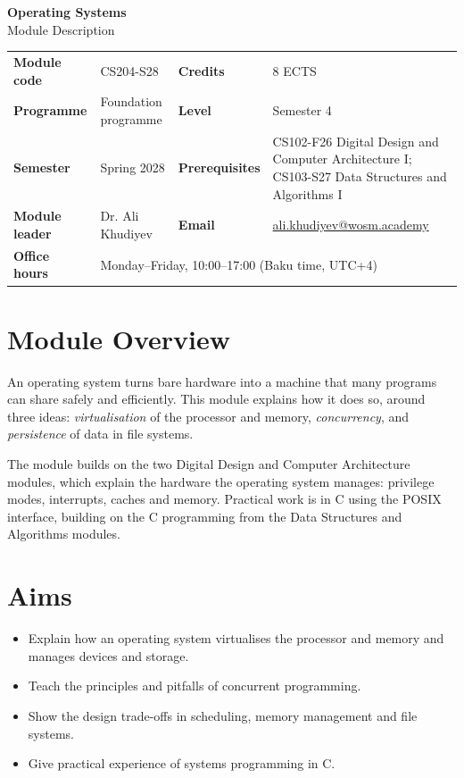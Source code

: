 \documentclass[11pt,a4paper]{article}
\makeatletter
\newcommand{\ModuleTitle}{Operating Systems}
\newcommand{\ModuleCode}{CS204-S28}
\newcommand{\Programme}{Foundation programme}
\newcommand{\Level}{Semester 4}
\newcommand{\Semester}{Spring 2028}
\newcommand{\Credits}{8 ECTS}
\newcommand{\ModuleLeader}{Dr. Ali Khudiyev}
\newcommand{\Email}{ali.khudiyev@wosm.academy}
\newcommand{\OfficeHours}{Monday--Friday, 10:00--17:00 (Baku time, UTC+4)}
\newcommand{\Prerequisites}{CS102-F26 Digital Design and Computer Architecture I; CS103-S27 Data Structures and Algorithms I}
\makeatother
\begin{document}
\begin{center}
  {\LARGE\bfseries\color{accent} \ModuleTitle}\\[4pt]
  {\large Module Description}
\end{center}
\vspace{6pt}

\begin{tabularx}{\textwidth}{>{\bfseries}l X >{\bfseries}l X}
\toprule
Module code   & \ModuleCode    & Credits      & \Credits \\
Programme     & \Programme     & Level        & \Level \\
Semester      & \Semester      & Prerequisites & \Prerequisites \\
Module leader & \ModuleLeader  & Email        & \href{mailto:\Email}{\Email} \\
Office hours  & \multicolumn{3}{l}{\OfficeHours} \\
\bottomrule
\end{tabularx}

\section{Module Overview}
An operating system turns bare hardware into a machine that many programs can share
safely and efficiently. This module explains how it does so, around three ideas:
\emph{virtualisation} of the processor and memory, \emph{concurrency}, and
\emph{persistence} of data in file systems.

The module builds on the two Digital Design and Computer Architecture modules, which
explain the hardware the operating system manages: privilege modes, interrupts,
caches and memory. Practical work is in C using the POSIX interface, building on the
C programming from the Data Structures and Algorithms modules.

\section{Aims}
\begin{itemize}
  \item Explain how an operating system virtualises the processor and memory and manages devices and storage.
  \item Teach the principles and pitfalls of concurrent programming.
  \item Show the design trade-offs in scheduling, memory management and file systems.
  \item Give practical experience of systems programming in C.
\end{itemize}
\end{document}
